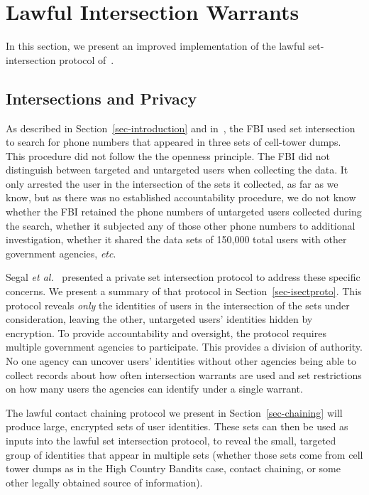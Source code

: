 \section{Lawful Intersection Warrants}\label{sec-intersection}
In this section, we present an improved implementation of the lawful
set-intersection protocol of~\cite{sff-foci2014}. 
\subsection{Intersections and Privacy}

As described in Section~\ref{sec-introduction} and in~\cite{sff-foci2014}, the FBI used
set intersection to search for phone numbers that appeared in three sets of
cell-tower dumps. This procedure did not follow the the openness principle.
The FBI did not distinguish between targeted and untargeted users when
collecting the data. It only arrested the user in the intersection of the sets
it collected, as far as we know, but as there was no established accountability
procedure, we do not know whether the FBI retained the phone numbers of
untargeted users collected during the search, whether it subjected any of those
other phone numbers to additional investigation, whether it shared the data sets
of 150,000 total users with other government agencies, \emph{etc}. 

Segal \emph{et al.}~\cite{sff-foci2014} presented a private set intersection
protocol to address these specific concerns. We present a summary of that protocol
in Section~\ref{sec-isectproto}. This protocol reveals \emph{only} the identities
of users in the intersection of the sets under consideration, leaving the other,
untargeted users' identities hidden by encryption. To provide accountability and
oversight, the protocol requires multiple government agencies to participate. This
provides a division of authority. No one agency can uncover users' identities
without other agencies being able to collect records about how often intersection
warrants are used and set restrictions on how many users the agencies can identify
under a single warrant.

The lawful contact chaining protocol we present in Section~\ref{sec-chaining} will
produce large, encrypted sets of user identities. These sets can then be used as
inputs into the lawful set intersection protocol, to reveal the small, targeted
group of identities that appear in multiple sets (whether those sets come from cell
tower dumps as in the High Country Bandits case, contact chaining, or some other
legally obtained source of information). 

